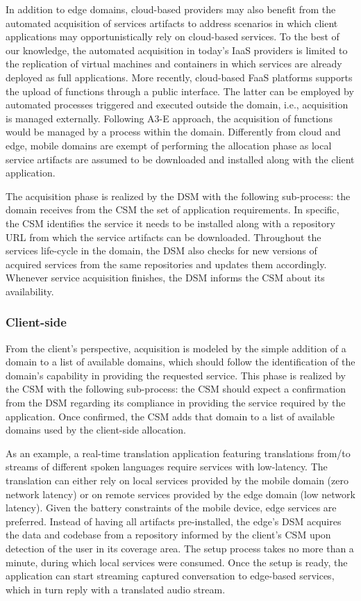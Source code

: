 In addition to edge domains, cloud-based providers may also benefit from the automated acquisition of services artifacts to address scenarios in which client applications may opportunistically rely on cloud-based services. To the best of our knowledge, the automated acquisition in today's IaaS providers is limited to the replication of virtual machines and containers in which services are already deployed as full applications. More recently, cloud-based FaaS platforms supports the upload of functions through a public interface. The latter can be employed by automated processes triggered and executed outside the domain, i.e., acquisition is managed externally. Following A3-E approach, the acquisition of functions would be managed by a process within the domain. Differently from cloud and edge, mobile domains are exempt of performing the allocation phase as local service artifacts are assumed to be downloaded and installed along with the client application.

The acquisition phase is realized by the DSM with the following sub-process: the domain receives from the CSM the set of application requirements. In specific, the CSM identifies the service it needs to be installed along with a repository URL from which the service artifacts can be downloaded. Throughout the services life-cycle in the domain, the DSM also checks for new versions of acquired services from the same repositories and updates them accordingly. Whenever service acquisition finishes, the DSM informs the CSM about its availability.

\subsubsection*{Client-side} From the client's perspective, acquisition is modeled by the simple addition of a domain to a list of available domains, which should follow the identification of the domain's capability in providing the requested service. This phase is realized by the CSM with the following sub-process: the CSM should expect a confirmation from the DSM regarding its compliance in providing the service required by the application. Once confirmed, the CSM adds that domain to a list of available domains used by the client-side allocation. 

As an example, a real-time translation application featuring translations from/to streams of different spoken languages require services with low-latency. The translation can either rely on local services provided by the mobile domain (zero network latency) or on remote services provided by the edge domain (low network latency). Given the battery constraints of the mobile device, edge services are preferred. Instead of having all artifacts pre-installed, the edge's DSM acquires the data and codebase from a repository informed by the client's CSM upon detection of the user in its coverage area. The setup process takes no more than a minute, during which local services were consumed. Once the setup is ready, the application can start streaming captured conversation to edge-based services, which in turn reply with a translated audio stream.

